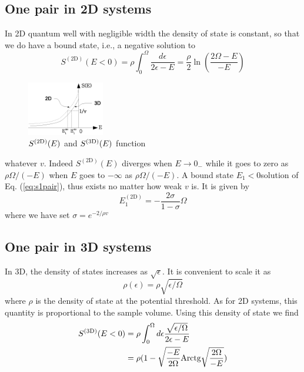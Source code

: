 \documentclass[aps,prb,showpacs,reprint]{revtex4-1}
\begin{document}
\subsection{One pair in 2D systems}
In 2D quantum well with negligible width the density of state is constant, so that we do have a bound state, i.e., a negative solution to 
\begin{equation}
S^{(\text{2D})}(E<0)=\rho\int_0^{\Omega}\frac{d\epsilon}{2\epsilon-E}=\frac{\rho}{2}\ln\left(\frac{2\Omega-E}{-E}\right)
\label{eq:s1pair}
\end{equation}
\begin{figure}[htbp]
	\centering
		\includegraphics[width=0.30\textwidth]{OnePair.eps}
	\caption{$S^{{\text{(2D)}}}(E)$ and $S^{{{\text{(3D)}}}}(E)$ function}
	\label{fig:OnePair}
\end{figure}
whatever $v$. Indeed $S^{(\text{2D})}(E)$ diverges when $E\rightarrow{}0_{-}$ while it goes to zero as $\rho\Omega/(-E)$ when $E$ goes to $-\infty$ as $\rho\Omega/(-E)$. A bound state $E_1<0$solution of Eq. (\ref{eq:s1pair}), thus exists no matter how weak $v$ is. It is given by 
\begin{equation}
E_1^{(\text{2D})}=-\frac{2\sigma}{1-\sigma}\Omega
\label{eq:}
\end{equation}
where we have set $\sigma=e^{-2/\rho{v}}$



\subsection{One pair in 3D systems}
In 3D, the density of states increases as $\sqrt{\epsilon}$. It is convenient to scale it as 
\begin{equation}
\rho(\epsilon)=\rho\sqrt{\epsilon/\Omega}
\label{eq:}
\end{equation}
where $\rho$ is the density of state at the potential threshold. As for 2D systems, this quantity is proportional to the sample volume.   Using this density of state we find
\begin{equation}
\begin{split}
S^{{\text{(3D)}}}(E<0)&=\rho\int_0^{\Omega}{}d\epsilon\frac{\sqrt{\epsilon/\Omega}}{2\epsilon-E}\\
	&=\rho(1-\sqrt{\frac{-E}{2\Omega}}\text{Arctg}\sqrt{\frac{2\Omega}{-E}})
\label{eq:}
\end{split}
\end{equation}
\end{document}
